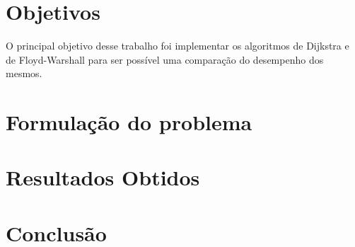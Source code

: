\documentclass[
12pt,				%
openright,			%
oneside,			%
a4paper,			%
english,			%
french,				%
spanish,			%
brazil,				%
]{abntex2}
\begin{document}
	
	
	
	
	\chapter{Objetivos}
	O principal objetivo desse trabalho foi implementar os algoritmos de Dijkstra e de Floyd-Warshall para ser possível uma comparação do desempenho dos mesmos.
	
	\chapter{Formulação do problema}
	\chapter{Resultados Obtidos}
	\chapter{Conclusão}
	
	\cite{algo}
	\cite{cardoso2005teoria}
	\cite{coelho2013teoria}
	\cite{costa2011teoria}
	\cite{costalonga2012grafos}
	\cite{deteoria}
	\cite{feofiloff2011introduccao}
	
	
	
\end{document}
